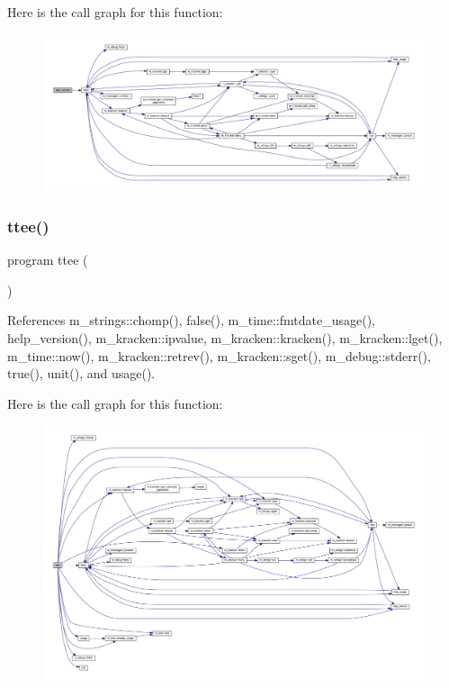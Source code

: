 Here is the call graph for this function\+:
\nopagebreak
\begin{figure}[H]
\begin{center}
\leavevmode
\includegraphics[width=350pt]{ttee_8f90_a52d584f615aee4df11405de887c661b4_cgraph}
\end{center}
\end{figure}
\mbox{\label{ttee_8f90_aee7d8fff0d52c9b2adc07bda770aa84c}} 
\subsubsection{\texorpdfstring{ttee()}{ttee()}}
{\footnotesize\ttfamily program ttee (\begin{DoxyParamCaption}{ }\end{DoxyParamCaption})}



References m\+\_\+strings\+::chomp(), false(), m\+\_\+time\+::fmtdate\+\_\+usage(), help\+\_\+version(), m\+\_\+kracken\+::ipvalue, m\+\_\+kracken\+::kracken(), m\+\_\+kracken\+::lget(), m\+\_\+time\+::now(), m\+\_\+kracken\+::retrev(), m\+\_\+kracken\+::sget(), m\+\_\+debug\+::stderr(), true(), unit(), and usage().

Here is the call graph for this function\+:
\nopagebreak
\begin{figure}[H]
\begin{center}
\leavevmode
\includegraphics[width=350pt]{ttee_8f90_aee7d8fff0d52c9b2adc07bda770aa84c_cgraph}
\end{center}
\end{figure}
\mbox{\label{ttee_8f90_a39e87a9f7d8f8fd9a22b457c12d7619a}} 
